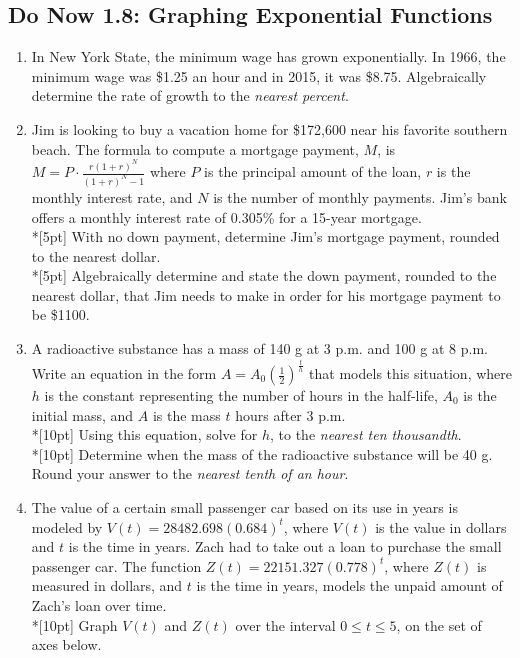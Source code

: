 \documentclass[12pt, oneside]{article}
\begin{document}
\newpage
\subsection*{Do Now 1.8: Graphing Exponential Functions}
\begin{enumerate}

  \item %
  In New York State, the minimum wage has grown exponentially. In 1966, the minimum wage was \$1.25 an hour and in 2015, it was \$8.75. Algebraically determine the rate of growth to the \textit{nearest percent}.

  \item %
  Jim is looking to buy a vacation home for \$172,600 near his favorite southern beach. The formula to compute a mortgage payment, $M$, is $\displaystyle M=P \cdot \frac{r(1+r)^N}{(1+r)^N-1}$ where $P$ is the principal amount of the loan, $r$ is the monthly interest rate, and $N$ is the number of monthly payments. Jim's bank offers a monthly interest rate of 0.305\% for a 15-year mortgage.\\*[5pt]
  With no down payment, determine Jim's mortgage payment, rounded to the nearest dollar.\\*[5pt]
  Algebraically determine and state the down payment, rounded to the nearest dollar, that Jim needs to make in order for his mortgage payment to be \$1100.

  \item %
  A radioactive substance has a mass of 140 g at 3 p.m. and 100 g at 8 p.m. Write an equation in the form $\displaystyle A = A_0 \left( \frac{1}{2}\right) ^\frac{t}{h}$ that models this situation, where $h$ is the constant representing the number of hours in the half-life, $A_0$ is the initial mass, and $A$ is the mass $t$ hours after 3 p.m.\\*[10pt]
  Using this equation, solve for $h$, to the \textit{nearest ten thousandth}.\\*[10pt]
  Determine when the mass of the radioactive substance will be 40 g. Round your answer to the \textit{nearest tenth of an hour}.

  \newpage %
  \item %
  The value of a certain small passenger car based on its use in years is modeled by $V(t) =28482.698(0.684)^t$,
  where $V(t)$ is the value in dollars and $t$ is the time in years.
  Zach had to take out a loan to purchase the small passenger car. The function $Z(t) = 22151.327(0.778)^t$, where $Z(t)$ is measured in dollars,
  and $t$ is the time in years, models the unpaid amount of Zach's loan over time.\\*[10pt]
  Graph $V(t)$ and $Z(t)$ over the interval $0 \leq t \leq 5$, on the set of axes below.


\end{enumerate}
\end{document}
